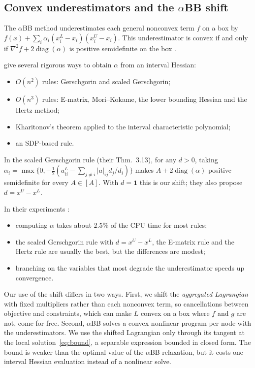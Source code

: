 \documentclass[11pt]{article}
\begin{document}
\subsection{Convex underestimators and the $\alpha$BB shift}

The $\alpha$BB method \citep{Androulakis1995,Adjiman1998a,Adjiman1998b} underestimates
each general nonconvex term $f$ on a box by
$f(x) + \sum_i \alpha_i (x_i^L - x_i)(x_i^U - x_i)$. This underestimator is convex if
and only if $\nabla^2 f + 2\operatorname{diag}(\alpha)$ is positive semidefinite on the
box \citep[Thm.~2.1]{Adjiman1998a}.

\citet{Adjiman1998a} give several rigorous ways to obtain $\alpha$ from an interval
Hessian:
\begin{itemize}
\item $O(n^2)$ rules: Gerschgorin and scaled Gerschgorin;
\item $O(n^3)$ rules: E-matrix, Mori--Kokame, the lower bounding Hessian and the Hertz
  method;
\item Kharitonov's theorem applied to the interval characteristic polynomial;
\item an SDP-based rule.
\end{itemize}
In the scaled Gerschgorin rule (their Thm.~3.13), for any $d > 0$, taking
$\alpha_i = \max\{0, -\frac{1}{2}(a^L_{ii} - \sum_{j\ne i} \lvert a \rvert_{ij} d_j/d_i)\}$
makes $A + 2\operatorname{diag}(\alpha)$ positive semidefinite for every $A \in [A]$.
With $d = \mathbf 1$ this is our shift; they also propose
$d = x^U - x^L$.

In their experiments \citep{Adjiman1998b}:
\begin{itemize}
\item computing $\alpha$ takes about 2.5\% of the CPU time for most rules;
\item the scaled Gerschgorin rule with $d = x^U - x^L$, the E-matrix rule and the Hertz
  rule are usually the best, but the differences are modest;
\item branching on the variables that most degrade the underestimator speeds up
  convergence.
\end{itemize}

Our use of the shift differs in two ways. First, we shift the \emph{aggregated
Lagrangian} with fixed multipliers rather than each nonconvex term, so cancellations
between objective and constraints, which can make $L$ convex on a box where $f$ and
$g$ are not, come for free. Second, $\alpha$BB solves a convex nonlinear program per
node with the underestimators. We use the shifted Lagrangian only through its tangent
at the local solution~\eqref{eq:bound}, a separable expression bounded in closed form.
The bound is weaker than the optimal value of the $\alpha$BB relaxation, but it costs
one interval Hessian evaluation instead of a nonlinear solve.
\end{document}

